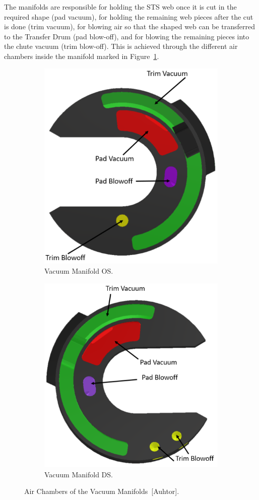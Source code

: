 The manifolds are responsible for holding the STS web once it is cut in the required shape (pad vacuum), for holding the remaining web pieces after the cut is done (trim vacuum), for blowing air so that the shaped web can be transferred to the Transfer Drum (pad blow-off), and for blowing the remaining pieces into the chute vacuum (trim blow-off). This is achieved through the different air chambers inside the manifold marked in Figure~\ref{manifolds}.
\begin{figure}[H]
\centering
  \begin{subfigure}{0.4\textwidth}
  \centering
    \includegraphics[width=0.8\linewidth]{FIGURES/manifoldOS.png}
    \caption{Vacuum Manifold OS.}
  \end{subfigure}
  \begin{subfigure}{0.4\textwidth}
  \centering
    \includegraphics[width=0.8\linewidth]{FIGURES/manifoldDS.png}
    \caption{Vacuum Manifold DS.}
  \end{subfigure}
  \caption{Air Chambers of the Vacuum Manifolds~[Auhtor].}
    \label{manifolds}
\end{figure}

